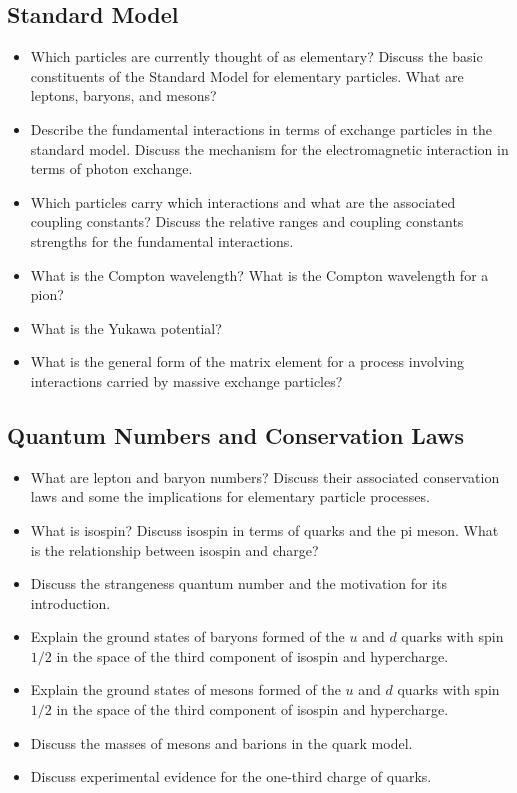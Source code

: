 \subsection{Standard Model}
\begin{itemize}
	\item Which particles are currently thought of as elementary?
    Discuss the basic constituents of the Standard Model for elementary particles.
    What are leptons, baryons, and mesons?
	
	\item Describe the fundamental interactions in terms of exchange particles in the standard model.
	Discuss the mechanism for the electromagnetic interaction in terms of photon exchange.

	\item Which particles carry which interactions and what are the associated coupling constants?
    Discuss the relative ranges and coupling constants strengths for the fundamental interactions.
	
	\item What is the Compton wavelength?
    What is the Compton wavelength for a pion?
	
	\item What is the Yukawa potential? 
	
	\item What is the general form of the matrix element for a process involving interactions carried by massive exchange particles?
	
\end{itemize}

\subsection{Quantum Numbers and Conservation Laws}
\begin{itemize}
	\item What are lepton and baryon numbers?
    Discuss their associated conservation laws and some the implications for elementary particle processes.

	\item What is isospin?
    Discuss isospin in terms of quarks and the pi meson.
    What is the relationship between isospin and charge?
	
	\item Discuss the strangeness quantum number and the motivation for its introduction.
	
	\item Explain the ground states of baryons formed of the $u$ and $d$ quarks with spin $1/2$ in the space of the third component of isospin and hypercharge.
		
	\item Explain the ground states of mesons formed of the $u$ and $d$ quarks with spin $1/2$ in the space of the third component of isospin and hypercharge.
	
	\item Discuss the masses of mesons and barions in the quark model.
	
	\item Discuss experimental evidence for the one-third charge of quarks.
\end{itemize}

